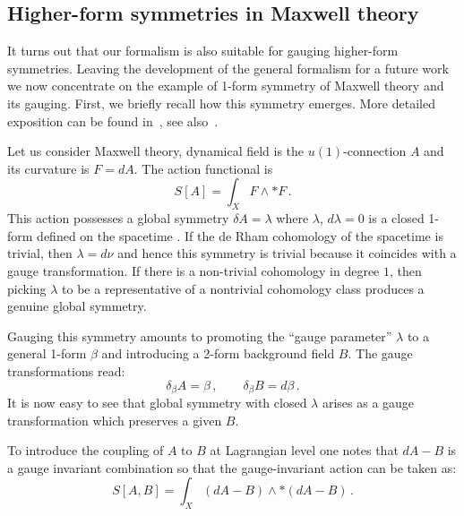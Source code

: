 \documentclass[a4paper,12pt]{article}
\numberwithin{equation}{section} %
\begin{document}
\subsection{Higher-form symmetries in Maxwell theory}
It turns out that our formalism is also suitable for gauging higher-form symmetries. Leaving the development of the general formalism for a future work we now concentrate on the example of 1-form symmetry of Maxwell theory and its gauging. First, we briefly recall how this symmetry emerges. More detailed exposition can be found in~\cite{Hull:2024uwz}, see also~\cite{Gaiotto:2014kfa}.

Let us consider Maxwell theory, dynamical field is the $u(1)$-connection $A$ and its curvature is $F = dA$. The action functional is 
\begin{equation}
    S[A] = \int_X F \wedge * F\,.
\end{equation}
This action possesses a global symmetry $\delta A = \lambda$ where $\lambda$, $d\lambda = 0$ is a closed 1-form defined on the spacetime . If the de Rham cohomology of the spacetime is trivial, then $\lambda=d\nu$ and hence this symmetry is trivial because it coincides with  a gauge transformation. If there is a non-trivial cohomology in degree $1$, then picking $\lambda$ to be a representative of a nontrivial cohomology class produces a genuine global symmetry. 

Gauging this symmetry amounts to promoting the ``gauge parameter'' $\lambda$ to a general 1-form $\beta$ and introducing a 2-form background field $B$. The gauge transformations read:
\begin{equation}
\label{AB-gauge}
    \delta_\beta A = \beta\,, \qquad \delta_\beta B = d\beta\,.
\end{equation}
It is now easy to see that global symmetry with closed $\lambda$ arises as a gauge transformation which preserves a given $B$. 

To introduce the coupling of $A$ to $B$ at Lagrangian level one notes that $dA - B$ is a gauge invariant combination so that the gauge-invariant action can be taken as: 
\begin{equation} \label{gauged_elec}
    S[A,B] = \int_X (dA-B)\wedge * (dA-B)\,.
\end{equation}
\end{document}
